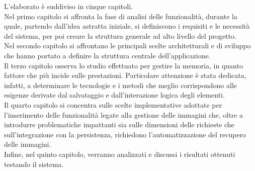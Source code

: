 L'elaborato è suddiviso in cinque capitoli.\\
Nel primo capitolo si affronta la fase di analisi delle funzionalità,
durante la quale, partendo dall'idea astratta iniziale,
si definiscono i requisiti e le necessità del sistema,
per poi creare la struttura generale ad alto livello del progetto.\\
Nel secondo capitolo si affrontano le principali scelte architetturali e di sviluppo
che hanno portato a definire la struttura centrale dell'applicazione.\\
Il terzo capitolo osserva lo studio effettuato per gestire la memoria, 
in quanto fattore che più incide sulle prestazioni. 
Particolare attenzione è stata dedicata, infatti, 
a determinare le tecnologie e i metodi che meglio corrispondono alle esigenze 
derivate dal salvataggio e dall'interazione logica degli elementi.\\
Il quarto capitolo si concentra sulle scelte implementative adottate 
per l'inserimento delle funzionalità legate alla gestione delle immagini che, 
oltre a introdurre problematiche impattanti sia sulle dimensioni delle richieste 
che sull'integrazione con la persistenza, 
richiedono l'automatizzazione del recupero delle immagini.\\
Infine, nel quinto capitolo, verranno analizzati e discussi i risultati ottenuti
testando il sistema.


\clearpage
